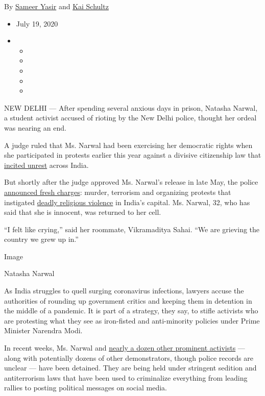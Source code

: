 By \href{https://www.nytimes.com/by/sameer-yasir}{Sameer Yasir} and
\href{https://www.nytimes.com/by/kai-schultz}{Kai Schultz}

\begin{itemize}
\item
  July 19, 2020
\item
  \begin{itemize}
  \item
  \item
  \item
  \item
  \item
  \end{itemize}
\end{itemize}

NEW DELHI --- After spending several anxious days in prison, Natasha
Narwal, a student activist accused of rioting by the New Delhi police,
thought her ordeal was nearing an end.

A judge ruled that Ms. Narwal had been exercising her democratic rights
when she participated in protests earlier this year against a divisive
citizenship law that
\href{https://www.nytimes.com/2019/12/22/world/asia/modi-india-citizenship-law.html}{incited
unrest} across India.

But shortly after the judge approved Ms. Narwal's release in late May,
the police
\href{https://scroll.in/latest/963353/delhi-violence-pinjra-tod-member-natasha-narwal-booked-under-uapa}{announced
fresh charges}: murder, terrorism and organizing protests that
instigated
\href{https://www.nytimes.com/2020/02/25/world/asia/new-delhi-hindu-muslim-violence.html}{deadly
religious violence} in India's capital. Ms. Narwal, 32, who has said
that she is innocent, was returned to her cell.

``I felt like crying,'' said her roommate, Vikramaditya Sahai. ``We are
grieving the country we grew up in.''

Image

Natasha Narwal

As India struggles to quell surging coronavirus infections, lawyers
accuse the authorities of rounding up government critics and keeping
them in detention in the middle of a pandemic. It is part of a strategy,
they say, to stifle activists who are protesting what they see as
iron-fisted and anti-minority policies under Prime Minister Narendra
Modi.

In recent weeks, Ms. Narwal and
\href{https://www.ohchr.org/EN/NewsEvents/Pages/DisplayNews.aspx?NewsID=26002\&LangID=E}{nearly
a dozen other prominent activists} --- along with potentially dozens of
other demonstrators, though police records are unclear --- have been
detained. They are being held under stringent sedition and antiterrorism
laws that have been used to criminalize everything from leading rallies
to posting political messages on social media.

